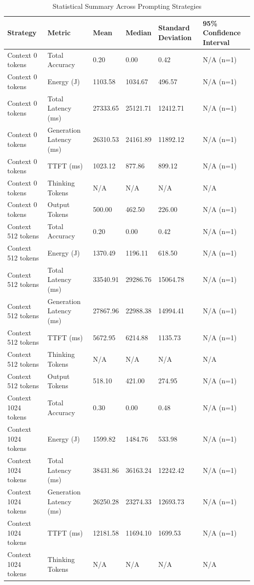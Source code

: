 \begin{table}
\caption{Statistical Summary Across Prompting Strategies}
\label{tab:statistical_summary}
\begin{tabular}{llllll}
\toprule
Strategy & Metric & Mean & Median & Standard Deviation & 95\% Confidence Interval \\
\midrule
Context 0 tokens & Total Accuracy & 0.20 & 0.00 & 0.42 & N/A (n=1) \\
Context 0 tokens & Energy (J) & 1103.58 & 1034.67 & 496.57 & N/A (n=1) \\
Context 0 tokens & Total Latency (ms) & 27333.65 & 25121.71 & 12412.71 & N/A (n=1) \\
Context 0 tokens & Generation Latency (ms) & 26310.53 & 24161.89 & 11892.12 & N/A (n=1) \\
Context 0 tokens & TTFT (ms) & 1023.12 & 877.86 & 899.12 & N/A (n=1) \\
Context 0 tokens & Thinking Tokens & N/A & N/A & N/A & N/A \\
Context 0 tokens & Output Tokens & 500.00 & 462.50 & 226.00 & N/A (n=1) \\
Context 512 tokens & Total Accuracy & 0.20 & 0.00 & 0.42 & N/A (n=1) \\
Context 512 tokens & Energy (J) & 1370.49 & 1196.11 & 618.50 & N/A (n=1) \\
Context 512 tokens & Total Latency (ms) & 33540.91 & 29286.76 & 15064.78 & N/A (n=1) \\
Context 512 tokens & Generation Latency (ms) & 27867.96 & 22988.38 & 14994.41 & N/A (n=1) \\
Context 512 tokens & TTFT (ms) & 5672.95 & 6214.88 & 1135.73 & N/A (n=1) \\
Context 512 tokens & Thinking Tokens & N/A & N/A & N/A & N/A \\
Context 512 tokens & Output Tokens & 518.10 & 421.00 & 274.95 & N/A (n=1) \\
Context 1024 tokens & Total Accuracy & 0.30 & 0.00 & 0.48 & N/A (n=1) \\
Context 1024 tokens & Energy (J) & 1599.82 & 1484.76 & 533.98 & N/A (n=1) \\
Context 1024 tokens & Total Latency (ms) & 38431.86 & 36163.24 & 12242.42 & N/A (n=1) \\
Context 1024 tokens & Generation Latency (ms) & 26250.28 & 23274.33 & 12693.73 & N/A (n=1) \\
Context 1024 tokens & TTFT (ms) & 12181.58 & 11694.10 & 1699.53 & N/A (n=1) \\
Context 1024 tokens & Thinking Tokens & N/A & N/A & N/A & N/A \\

\end{tabular}
\end{table}
